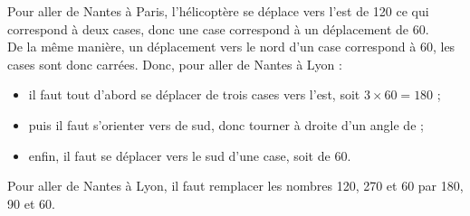    Pour aller de Nantes à Paris, l'hélicoptère se déplace vers l'est de 120 ce qui correspond à deux cases, donc une case correspond à un déplacement de 60. \\
   De la même manière, un déplacement vers le nord d'un case correspond à 60, les cases sont donc carrées. Donc, pour aller de Nantes à Lyon :
   \begin{itemize}
      \item il faut tout d'abord se déplacer de trois cases vers l'est, soit $3\times60 =180$ ;
      \item  puis il faut s'orienter vers de sud, donc tourner à droite d'un angle de  ;
      \item enfin, il faut se déplacer vers le sud d'une case, soit de 60.
   \end{itemize}
   Pour aller de Nantes à Lyon, {\blue il faut remplacer les nombres 120, 270 et 60 par 180, 90 et 60}.
